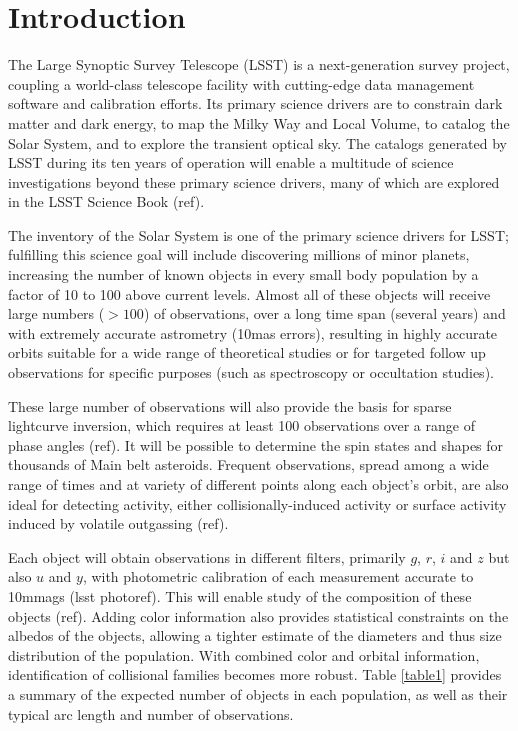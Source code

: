 \documentclass{iau}
\begin{document}
\section{Introduction}

The Large Synoptic Survey Telescope (LSST) is a next-generation survey
project, coupling a world-class telescope facility with cutting-edge
data management software and calibration efforts. Its primary science
drivers are to constrain dark matter and dark energy, to map the Milky
Way and Local Volume, to catalog the Solar System, and to explore
the transient optical sky. The catalogs generated by LSST during its
ten years of operation will enable a multitude of science
investigations beyond these primary science drivers, many of which are
explored in the LSST Science Book (ref).

The inventory of the Solar System is one of the primary science
drivers for LSST; fulfilling this science goal will include
discovering millions of minor planets, increasing the number of known
objects in every small body population by a factor of 10 to 100 above
current levels. Almost all of these objects will receive large numbers
($>100$) of observations, over a long time span (several years) and with
extremely accurate astrometry (10mas errors), resulting in highly
accurate orbits suitable for a wide range of theoretical studies or
for targeted follow up observations for specific purposes (such as
spectroscopy or occultation studies).

These large number of observations will also provide the basis for
sparse lightcurve inversion, which requires at least 100 observations
over a range of phase angles (ref). It will be possible to determine
the spin states and shapes for thousands of Main belt
asteroids. Frequent observations, spread among a wide range of times
and at variety of different points along each object's orbit, are also
ideal for detecting activity, either collisionally-induced activity or
surface activity induced by volatile outgassing (ref).

Each object will obtain observations in different filters, primarily $g$,
$r$, $i$ and $z$ but also $u$ and $y$, with photometric calibration of
each measurement accurate to 10mmags (lsst photoref). This will enable study of the
composition of these objects (ref). Adding color information also
provides statistical constraints on the albedos of the objects,
allowing a tighter estimate of the diameters and thus size
distribution of the population. With combined color and orbital
information, identification of collisional families becomes more
robust. Table \ref{table1} provides a summary of the expected number
of objects in each population, as well as their typical arc length and
number of observations.
\end{document}
